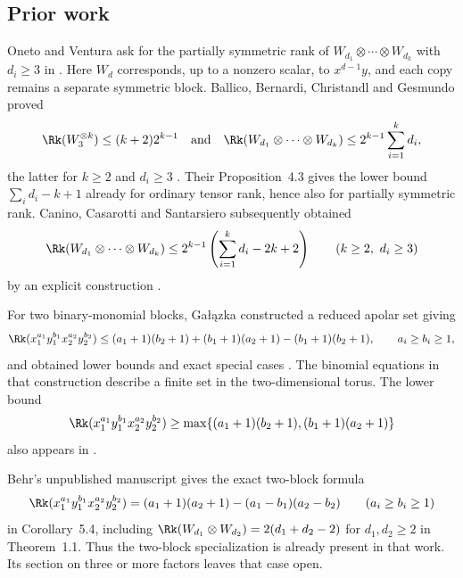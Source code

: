 \subsection{Prior work}

Oneto and Ventura ask for the partially symmetric rank of
$W_{d_1}\otimes\cdots\otimes W_{d_k}$ with $d_i\geq3$ in
\cite[Question~12]{OV}. Here $W_d$ corresponds, up to a nonzero scalar,
to $x^{d-1}y$, and each copy remains a separate symmetric block.
Ballico, Bernardi, Christandl and Gesmundo proved
\[
 \Rk(W_3^{\otimes k})\leq(k+2)2^{k-1}
 \quad\text{and}\quad
 \Rk(W_{d_1}\otimes\cdots\otimes W_{d_k})
 \leq 2^{k-1}\sum_{i=1}^k d_i,
\]
the latter for $k\geq2$ and $d_i\geq3$
\cite[Theorems~3.3 and~3.6]{BBCG}. Their Proposition~4.3 gives the
lower bound $\sum_i d_i-k+1$ already for ordinary tensor rank, hence
also for partially symmetric rank. Canino, Casarotti and Santarsiero
subsequently obtained
\[
 \Rk(W_{d_1}\otimes\cdots\otimes W_{d_k})
 \leq 2^{k-1}\left(\sum_{i=1}^k d_i-2k+2\right)
 \qquad(k\geq2,\ d_i\geq3)
\]
by an explicit construction \cite[Theorem~1.1]{CCS}.

For two binary-monomial blocks, Ga{\l}\k{a}zka constructed a reduced
apolar set giving
\[
 \Rk(x_1^{a_1}y_1^{b_1}x_2^{a_2}y_2^{b_2})
 \leq (a_1+1)(b_2+1)+(b_1+1)(a_2+1)
          -(b_1+1)(b_2+1),
 \qquad a_i\geq b_i\geq1,
\]
and obtained lower bounds and exact special cases
\cite[Theorem~1.5 and Section~7.1 of the arXiv version]{Galazka}.
The binomial equations in that construction describe a finite set in
the two-dimensional torus. The lower bound
\[
 \Rk(x_1^{a_1}y_1^{b_1}x_2^{a_2}y_2^{b_2})
 \geq \max\{(a_1+1)(b_2+1),(b_1+1)(a_2+1)\}
\]
also appears in \cite[Proposition~4.3 of the arXiv version]{BBGV}.

Behr's unpublished manuscript \cite{Behr} gives the exact two-block
formula
\[
 \Rk(x_1^{a_1}y_1^{b_1}x_2^{a_2}y_2^{b_2})
 =(a_1+1)(a_2+1)-(a_1-b_1)(a_2-b_2)
 \qquad(a_i\geq b_i\geq1)
\]
in Corollary~5.4, including
$\Rk(W_{d_1}\otimes W_{d_2})=2(d_1+d_2-2)$ for $d_1,d_2\geq2$
in Theorem~1.1. Thus the two-block specialization is already present
in that work. Its section on three or more factors leaves that case open.
